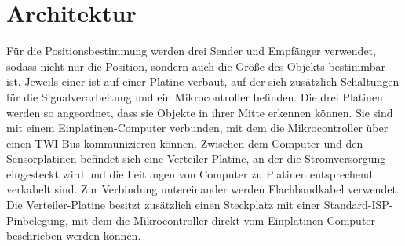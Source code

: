 \section{Architektur} %
Für die Positionsbestimmung werden drei Sender und Empfänger verwendet, sodass nicht nur die Position, sondern auch die Größe des Objekts bestimmbar ist. Jeweils einer ist auf einer Platine verbaut, auf der sich zusätzlich Schaltungen für die Signalverarbeitung und ein Mikrocontroller befinden. Die drei Platinen werden so angeordnet, dass sie Objekte in ihrer Mitte erkennen können. Sie sind mit einem Einplatinen-Computer verbunden, mit dem die Mikrocontroller über einen \ac{TWI}-Bus kommunizieren können. Zwischen dem Computer und den Sensorplatinen befindet sich eine Verteiler-Platine, an der die Stromversorgung eingesteckt wird und die Leitungen von Computer zu Platinen entsprechend verkabelt sind.
Zur Verbindung untereinander werden Flachbandkabel verwendet. Die Verteiler-Platine besitzt zusätzlich einen Steckplatz mit einer Standard-\ac{ISP}-Pinbelegung, mit dem die Mikrocontroller direkt vom Einplatinen-Computer beschrieben werden können.\\
